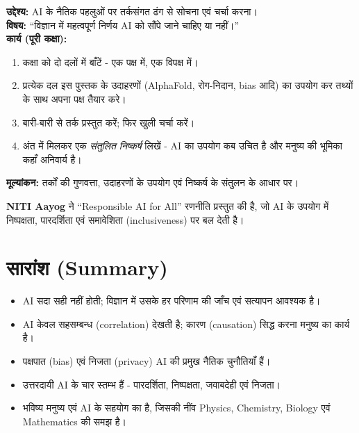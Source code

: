 \begin{pariyojana}[वाद-विवाद - विज्ञान में निर्णय किसका?]
\textbf{उद्देश्य:} AI के नैतिक पहलुओं पर तर्कसंगत ढंग से सोचना एवं चर्चा करना।\\[4pt]
\textbf{विषय:} “विज्ञान में महत्वपूर्ण निर्णय AI को सौंपे जाने चाहिए या नहीं।”\\[4pt]
\textbf{कार्य (पूरी कक्षा):}
\begin{enumerate}[leftmargin=1.6em]
  \item कक्षा को दो दलों में बाँटें - एक पक्ष में, एक विपक्ष में।
  \item प्रत्येक दल इस पुस्तक के उदाहरणों (AlphaFold, रोग-निदान, bias आदि) का उपयोग
        कर तथ्यों के साथ अपना पक्ष तैयार करे।
  \item बारी-बारी से तर्क प्रस्तुत करें; फिर खुली चर्चा करें।
  \item अंत में मिलकर एक \emph{संतुलित निष्कर्ष} लिखें - AI का उपयोग कब उचित है और
        मनुष्य की भूमिका कहाँ अनिवार्य है।
\end{enumerate}
\textbf{मूल्यांकन:} तर्कों की गुणवत्ता, उदाहरणों के उपयोग एवं निष्कर्ष के संतुलन के
आधार पर।
\end{pariyojana}

\begin{bharatai}
\textbf{NITI Aayog} ने “Responsible AI for All” रणनीति प्रस्तुत की है, जो AI के
उपयोग में निष्पक्षता, पारदर्शिता एवं समावेशिता (inclusiveness) पर बल देती है।
\end{bharatai}

\section*{सारांश (Summary)}
\begin{itemize}[leftmargin=1.4em]
  \item AI सदा सही नहीं होती; विज्ञान में उसके हर परिणाम की जाँच एवं सत्यापन आवश्यक है।
  \item AI केवल सहसम्बन्ध (correlation) देखती है; कारण (causation) सिद्ध करना मनुष्य का
        कार्य है।
  \item पक्षपात (bias) एवं निजता (privacy) AI की प्रमुख नैतिक चुनौतियाँ हैं।
  \item उत्तरदायी AI के चार स्तम्भ हैं - पारदर्शिता, निष्पक्षता, जवाबदेही एवं निजता।
  \item भविष्य मनुष्य एवं AI के सहयोग का है, जिसकी नींव Physics, Chemistry, Biology
        एवं Mathematics की समझ है।
\end{itemize}

